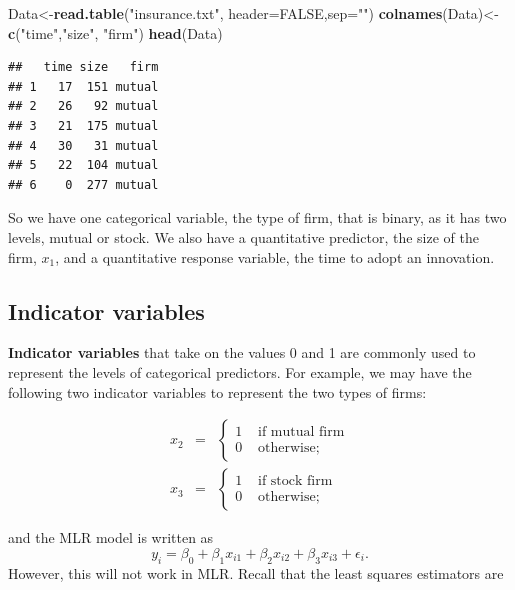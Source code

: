 \documentclass[
]{book}
\newenvironment{Shaded}{\begin{snugshade}}{\end{snugshade}}
\newcommand{\AttributeTok}[1]{\textcolor[rgb]{0.13,0.29,0.53}{#1}}
\newcommand{\ConstantTok}[1]{\textcolor[rgb]{0.56,0.35,0.01}{#1}}
\newcommand{\FunctionTok}[1]{\textcolor[rgb]{0.13,0.29,0.53}{\textbf{#1}}}
\newcommand{\NormalTok}[1]{#1}
\newcommand{\OtherTok}[1]{\textcolor[rgb]{0.56,0.35,0.01}{#1}}
\newcommand{\StringTok}[1]{\textcolor[rgb]{0.31,0.60,0.02}{#1}}
\begin{document}
\begin{Shaded}
\begin{Highlighting}[]
\NormalTok{Data}\OtherTok{\textless{}{-}}\FunctionTok{read.table}\NormalTok{(}\StringTok{"insurance.txt"}\NormalTok{, }\AttributeTok{header=}\ConstantTok{FALSE}\NormalTok{,}\AttributeTok{sep=}\StringTok{""}\NormalTok{)}
\FunctionTok{colnames}\NormalTok{(Data)}\OtherTok{\textless{}{-}}\FunctionTok{c}\NormalTok{(}\StringTok{"time"}\NormalTok{,}\StringTok{"size"}\NormalTok{, }\StringTok{"firm"}\NormalTok{)}
\FunctionTok{head}\NormalTok{(Data)}
\end{Highlighting}
\end{Shaded}

\begin{verbatim}
##   time size   firm
## 1   17  151 mutual
## 2   26   92 mutual
## 3   21  175 mutual
## 4   30   31 mutual
## 5   22  104 mutual
## 6    0  277 mutual
\end{verbatim}

So we have one categorical variable, the type of firm, that is binary, as it has two levels, mutual or stock. We also have a quantitative predictor, the size of the firm, \(x_1\), and a quantitative response variable, the time to adopt an innovation.

\hypertarget{indicator-variables}{%
\subsection{Indicator variables}\label{indicator-variables}}

\textbf{Indicator variables} that take on the values 0 and 1 are commonly used to represent the levels of categorical predictors. For example, we may have the following two indicator variables to represent the two types of firms:

\begin{eqnarray*}
x_2 &=& \left\{ \begin{array}{ll} 1 & \mbox{ if mutual firm} \\ 0 &
\mbox{ otherwise;} \end{array}\right. \\
x_3 &=& \left\{ \begin{array}{ll} 1 & \mbox{ if stock firm} \\ 0
& \mbox{ otherwise;} \end{array} \right.
\end{eqnarray*}

and the MLR model is written as
\[
y_i = \beta_0 + \beta_1x_{i1} + \beta_2x_{i2} + \beta_3x_{i3} +
\epsilon_i.
\]
However, this will not work in MLR. Recall that the least squares estimators are
\end{document}
